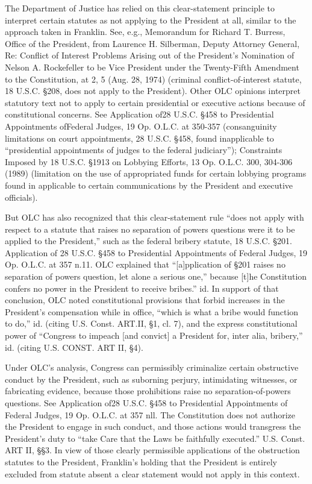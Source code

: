 The Department of Justice has relied on this clear-statement principle to interpret certain statutes as not applying to the President at all, similar to the approach taken in Franklin. 
See, e.g., Memorandum for Richard T. Burress, Office of the President, from Laurence H. Silberman, Deputy Attorney General, Re: Conflict of Interest Problems Arising out of the President's Nomination of Nelson A. Rockefeller to be Vice President under the Twenty-Fifth Amendment to the Constitution, at 2, 5 (Aug. 28, 1974) (criminal conflict-of-interest statute, 18 U.S.C. \S 208, does not apply to the President). 
Other OLC opinions interpret statutory text not to apply to certain presidential or executive actions because of constitutional concerns. 
See Application of28 U.S.C. \S 458 to Presidential Appointments ofFederal Judges, 19 Op. O.L.C. at 350-357 (consanguinity limitations on court appointments, 28 U.S.C. \S 458, found inapplicable to “presidential appointments of judges to the federal judiciary”); 
Constraints Imposed by 18 U.S.C. \S 1913 on Lobbying Efforts, 13 Op. O.L.C. 300, 304-306 (1989) (limitation on the use of appropriated funds for certain lobbying programs found in applicable to certain communications by the President and executive officials). 

But OLC has also recognized that this clear-statement rule “does not apply with respect to a statute that raises no separation of powers questions were it to be applied to the President,” such as the federal bribery statute, 18 U.S.C. \S 201. 
Application of 28 U.S.C. \S 458 to Presidential Appointments of Federal Judges, 19 Op. O.L.C. at 357 n.11. OLC explained that “[a]pplication of \S 201 raises no separation of powers question, let alone a serious one,” because [t]he Constitution confers no power in the President to receive bribes.” id. 
In support of that conclusion, OLC noted constitutional provisions that forbid increases in the President’s compensation while in office, “which is what a bribe would function to do,” id. (citing U.S. Const. ART.II, \S 1, cl. 7), and the express constitutional power of “Congress to impeach [and convict] a President for, inter alia, bribery,” id. (citing U.S. CONST. ART II, \S 4). 

Under OLC’s analysis, Congress can permissibly criminalize certain obstructive conduct by the President, such as suborning perjury, intimidating witnesses, or fabricating evidence, because those prohibitions raise no separation-of-powers questions. 
See Application of28 U.S.C. \S 458 to Presidential Appointments of Federal Judges, 19 Op. O.L.C. at 357 nll. 
The Constitution does not authorize the President to engage in such conduct, and those actions would transgress the President’s duty to “take Care that the Laws be faithfully executed.” U.S. Const. ART II, \S\S 3. 
In view of those clearly permissible applications of the obstruction statutes to the President, Franklin’s holding that the President is entirely excluded from statute absent a clear statement would not apply in this context. 

